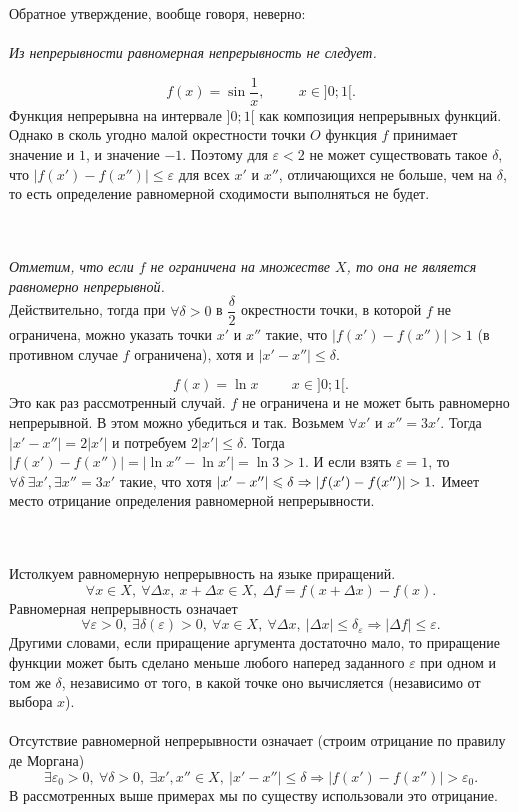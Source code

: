 	Обратное утверждение, вообще говоря, неверно:\\\\
	\textit{Из непрерывности равномерная непрерывность не следует.}\\
	\begin{example}
		$$f(x) = \sin{\dfrac{1}{x}},\hspace{1cm} x \in ]0;1[.$$
		Функция непрерывна на интервале $]0;1[$ как композиция непрерывных функций.\\
		Однако в сколь угодно малой окрестности точки $O$ функция $f$ принимает значение и $1$, и значение $-1$. Поэтому для $\varepsilon < 2$ не может существовать  такое $\delta$, что $\vert f(x') - f(x'')\vert \leqslant \varepsilon$ для всех $x'$ и $x''$, отличающихся не больше, чем на $\delta$, то есть определение равномерной сходимости выполняться не будет.
	\end{example}\\\\
	\textit{Отметим, что если $f$ не ограничена на множестве $X$, то она не является равномерно непрерывной.}\\
	Действительно, тогда при $\forall \delta > 0$ в $\dfrac{\delta}{2}$ окрестности точки, в которой $f$ не ограничена, можно указать точки $x'$ и $x''$ такие, что $\vert f(x') - f(x'')\vert > 1$ (в противном случае $f$ ограничена), хотя и $\vert x' - x''\vert  \leqslant \delta$.\\
	\begin{example}
		$$f(x) = \ln{x} \hspace{1cm} x\in ]0;1[.$$
		Это как раз рассмотренный случай. $f$ не ограничена и не может быть равномерно непрерывной. В этом можно убедиться и так. Возьмем $\forall x'$ и $x'' = 3x'$. Тогда $\vert x' - x''\vert = 2\vert x'\vert$ и потребуем $2\vert x'\vert \leqslant \delta$. Тогда $\vert f(x') - f(x'')\vert = \vert \ln{x''} - \ln{x'}\vert = \ln{3} > 1$. И если взять $\varepsilon = 1$, то $\forall\delta\ \exists x', \exists x'' = 3x'$ такие, что хотя $\vert x' - x''\vert\leqslant\delta\Rightarrow\vert f(x') - f(x'')\vert > 1.$
		Имеет место отрицание определения равномерной непрерывности.
	\end{example}\\\\
	Истолкуем равномерную непрерывность на языке приращений.
	$$\forall x \in X,\ \forall \Delta x,\ x + \Delta x \in X,\ \Delta f = f(x + \Delta x) - f(x).$$
	Равномерная непрерывность означает
	$$\forall \varepsilon > 0,\ \exists \delta(\varepsilon) > 0,\ \forall x \in X,\ \forall \Delta x,\ \vert \Delta x \vert \leqslant \delta_\varepsilon \Rightarrow \vert \Delta f \vert \leqslant \varepsilon.$$
	Другими словами, если приращение аргумента достаточно мало, то приращение функции может быть сделано меньше любого наперед заданного $\varepsilon$ при одном и том же $\delta$, независимо от того, в какой точке оно вычисляется (независимо от выбора $x$).\\\\
	Отсутствие равномерной непрерывности означает (строим отрицание по правилу де Моргана)
	$$\exists \varepsilon_0 > 0,\ \forall \delta > 0,\ \exists x', x'' \in X,\ \vert x' - x'' \vert \leqslant \delta \Rightarrow \vert f(x') - f(x'') \vert > \varepsilon_0.$$
	В рассмотренных выше примерах мы по существу использовали это отрицание.
